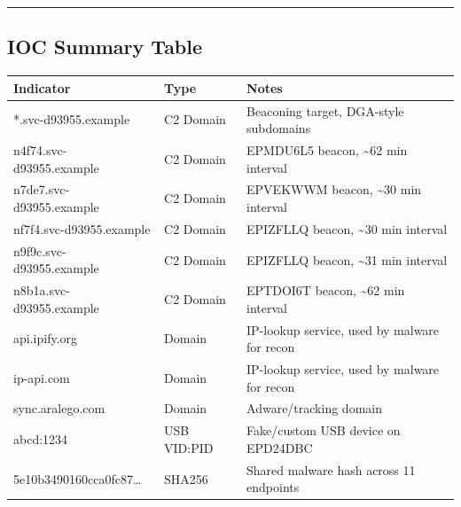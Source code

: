 \documentclass[
]{article}
\begin{document}
\begin{center}\rule{0.5\linewidth}{0.5pt}\end{center}

\subsection{IOC Summary Table}\label{ioc-summary-table}

\begin{longtable}[]{@{}
  >{\raggedright\arraybackslash}p{}
  >{\raggedright\arraybackslash}p{}
  >{\raggedright\arraybackslash}p{}@{}}
\toprule\noalign{}
\begin{minipage}[b]{\linewidth}\raggedright
Indicator
\end{minipage} & \begin{minipage}[b]{\linewidth}\raggedright
Type
\end{minipage} & \begin{minipage}[b]{\linewidth}\raggedright
Notes
\end{minipage} \\
\midrule\noalign{}
\endhead
\bottomrule\noalign{}
\endlastfoot
*.svc-d93955.example & C2 Domain & Beaconing target, DGA-style
subdomains \\
n4f74.svc-d93955.example & C2 Domain & EPMDU6L5 beacon,
\textasciitilde62 min interval \\
n7de7.svc-d93955.example & C2 Domain & EPVEKWWM beacon,
\textasciitilde30 min interval \\
nf7f4.svc-d93955.example & C2 Domain & EPIZFLLQ beacon,
\textasciitilde30 min interval \\
n9f9c.svc-d93955.example & C2 Domain & EPIZFLLQ beacon,
\textasciitilde31 min interval \\
n8b1a.svc-d93955.example & C2 Domain & EPTDOI6T beacon,
\textasciitilde62 min interval \\
api.ipify.org & Domain & IP-lookup service, used by malware for recon \\
ip-api.com & Domain & IP-lookup service, used by malware for recon \\
sync.aralego.com & Domain & Adware/tracking domain \\
abcd:1234 & USB VID:PID & Fake/custom USB device on EPD24DBC \\
5e10b3490160cca0fc87\ldots{} & SHA256 & Shared malware hash across 11
endpoints \\

\end{longtable}
\end{document}
